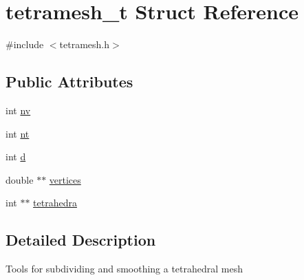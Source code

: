 \hypertarget{structtetramesh__t}{
\section{tetramesh\_\-t Struct Reference}
\label{structtetramesh__t}
}


{\ttfamily \#include $<$tetramesh.h$>$}

\subsection*{Public Attributes}
\begin{DoxyCompactItemize}
\item 
int \hyperlink{structtetramesh__t_a44c48045e28f4ffc611adabd3fa57279}{nv}
\item 
int \hyperlink{structtetramesh__t_abf103dd6de6a71c461af3d37d46acc05}{nt}
\item 
int \hyperlink{structtetramesh__t_a8a5f93d3d854d48d94261d7771e0308f}{d}
\item 
double $\ast$$\ast$ \hyperlink{structtetramesh__t_a2cd2d17e8889a5a63b43eb223a81cb02}{vertices}
\item 
int $\ast$$\ast$ \hyperlink{structtetramesh__t_a83e3bc639cdc60ab92d90615bcff647b}{tetrahedra}
\end{DoxyCompactItemize}


\subsection{Detailed Description}
Tools for subdividing and smoothing a tetrahedral mesh 

